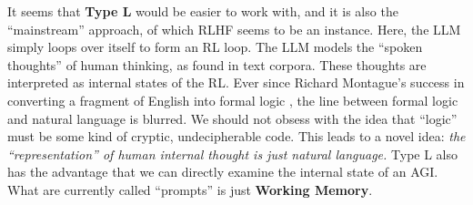 \documentclass[runningheads]{llncs}
\begin{document}

It seems that \textbf{Type L} would be easier to work with, and it is also the ``mainstream'' approach, of which RLHF seems to be an instance.  Here, the LLM simply loops over itself to form an RL loop.  The LLM models the ``spoken thoughts'' of human thinking, as found in text corpora.  These thoughts are interpreted as internal states of the RL.  Ever since Richard Montague's success in converting a fragment of English into formal logic \cite{Montague}, the line between formal logic and natural language is blurred.  We should not obsess with the idea that ``logic'' must be some kind of cryptic, undecipherable code.  This leads to a novel idea: \textit{the ``representation'' of human internal thought is just natural language.}  Type L also has the advantage that we can directly examine the internal state of an AGI.  What are currently called ``prompts'' is just \textbf{Working Memory}.
\end{document}
